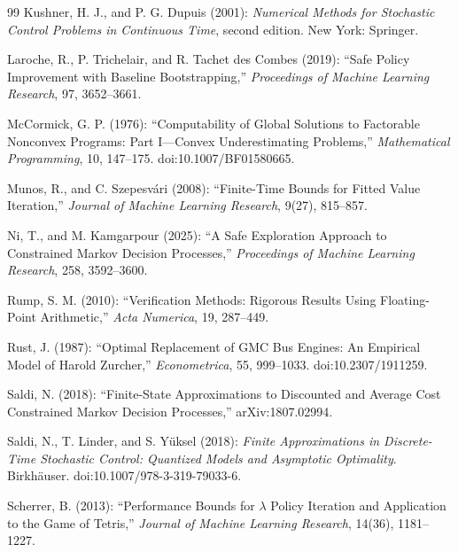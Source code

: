 \begin{thebibliography}{99}
Kushner, H. J., and P. G. Dupuis (2001): \emph{Numerical Methods for Stochastic Control Problems in Continuous Time}, second edition. New York: Springer.

Laroche, R., P. Trichelair, and R. Tachet des Combes (2019): ``Safe Policy Improvement with Baseline Bootstrapping,'' \emph{Proceedings of Machine Learning Research}, 97, 3652--3661.

McCormick, G. P. (1976): ``Computability of Global Solutions to Factorable Nonconvex Programs: Part I---Convex Underestimating Problems,'' \emph{Mathematical Programming}, 10, 147--175. doi:10.1007/BF01580665.

Munos, R., and C. Szepesv\'ari (2008): ``Finite-Time Bounds for Fitted Value Iteration,'' \emph{Journal of Machine Learning Research}, 9(27), 815--857.

Ni, T., and M. Kamgarpour (2025): ``A Safe Exploration Approach to Constrained Markov Decision Processes,'' \emph{Proceedings of Machine Learning Research}, 258, 3592--3600.

Rump, S. M. (2010): ``Verification Methods: Rigorous Results Using Floating-Point Arithmetic,'' \emph{Acta Numerica}, 19, 287--449.

Rust, J. (1987): ``Optimal Replacement of GMC Bus Engines: An Empirical Model of Harold Zurcher,'' \emph{Econometrica}, 55, 999--1033. doi:10.2307/1911259.

Saldi, N. (2018): ``Finite-State Approximations to Discounted and Average Cost Constrained Markov Decision Processes,'' arXiv:1807.02994.

Saldi, N., T. Linder, and S. Y\"uksel (2018): \emph{Finite Approximations in Discrete-Time Stochastic Control: Quantized Models and Asymptotic Optimality}. Birkh\"auser. doi:10.1007/978-3-319-79033-6.

Scherrer, B. (2013): ``Performance Bounds for $\lambda$ Policy Iteration and Application to the Game of Tetris,'' \emph{Journal of Machine Learning Research}, 14(36), 1181--1227.

\end{thebibliography}
